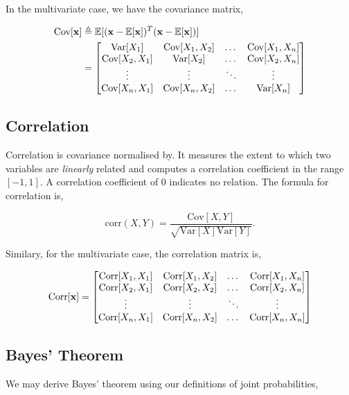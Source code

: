 \documentclass[11pt]{amsart}
\begin{document}
In the multivariate case, we have the covariance matrix,

\begin{align}
\text{Cov}[\mathbf{x}] &\triangleq \mathbb{E}[(\mathbf{x} - \mathbb{E}[\mathbf{x}])^T(\mathbf{x} - \mathbb{E}[\mathbf{x}])] \notag \\
&= \begin{bmatrix}
\text{Var}[X_1] & \text{Cov}[X_1, X_2] & \dots & \text{Cov}[X_1, X_n] \\
\text{Cov}[X_2, X_1] & \text{Var}[X_2] & \dots & \text{Cov}[X_2, X_n] \\
\vdots & \vdots & \ddots & \vdots \\
\text{Cov}[X_n, X_1] & \text{Cov}[X_n, X_2] &\dots & \text{Var}[X_n]
\end{bmatrix} \notag
\end{align}

\subsection{Correlation}

Correlation is covariance normalised by. It measures the extent to which two variables are \emph{linearly} related and computes a correlation coefficient in the range $[-1, 1]$. A correlation coefficient of 0 indicates no relation. The formula for correlation is,

$$\text{corr}(X, Y) = \frac{\text{Cov}[X, Y]}{\sqrt{\text{Var}[X]\text{Var}[Y]}}.$$

Similary, for the multivariate case, the correlation matrix is,

$$
\text{Corr}[\mathbf{x}] = \begin{bmatrix}
\text{Corr}[X_1, X_1] & \text{Corr}[X_1, X_2] & \dots & \text{Corr}[X_1, X_n] \\
\text{Corr}[X_2, X_1] & \text{Corr}[X_2, X_2] & \dots & \text{Corr}[X_2, X_n] \\
\vdots & \vdots & \ddots & \vdots \\
\text{Corr}[X_n, X_1] & \text{Corr}[X_n, X_2] &\dots & \text{Corr}[X_n, X_n]
\end{bmatrix} \notag
$$

\subsection{Bayes' Theorem}

We may derive Bayes' theorem using our definitions of joint probabilities,
\end{document}
